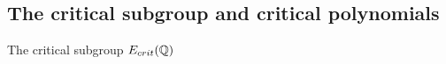 \documentclass[handout]{beamer}
\begin{document}


\subsection{The critical subgroup and critical polynomials}

\begin{frame}{The critical subgroup $E_{crit}(\mathbb{Q})$}










\end{frame}
\end{document}
